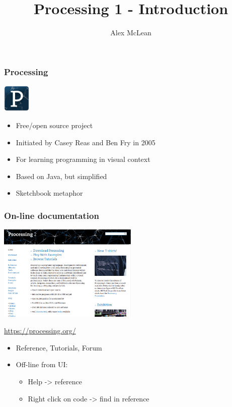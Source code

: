 \documentclass[ignorenonframetext,]{beamer}
\title{Processing 1 - Introduction}
\author{Alex McLean}
\begin{document}
\frame{\titlepage}

\begin{frame}\frametitle{Processing}

\includegraphics[width=0.1\textwidth]{../images/processing2-logo.jpg}

\begin{itemize}
\item
  Free/open source project
\item
  Initiated by Casey Reas and Ben Fry in 2005
\item
  For learning programming in visual context
\item
  Based on Java, but simplified
\item
  Sketchbook metaphor
\end{itemize}

\end{frame}

\begin{frame}\frametitle{On-line documentation}

\begin{center}
\includegraphics[width=0.5\textwidth]{../images/processingorg.png}

\url{https://processing.org/}
\end{center}

\begin{itemize}
\item
  Reference, Tutorials, Forum
\item
  Off-line from UI:

  \begin{itemize}
  \item
    Help -\textgreater{} reference
  \item
    Right click on code -\textgreater{} find in reference
  \end{itemize}
\end{itemize}

\end{frame}
\end{document}
